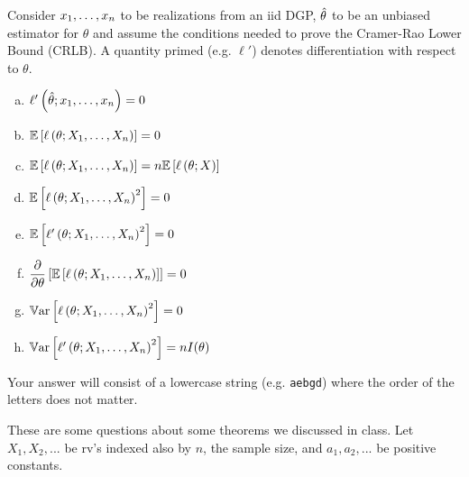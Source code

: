 \documentclass[12pt,landscape]{article}
\newcommand{\instr}{\small Your answer will consist of a lowercase string (e.g. \texttt{aebgd}) where the order of the letters does not matter. \normalsize}
\begin{document}


\problem{} Consider $x_1, \ldots, x_n$ to be realizations from an iid DGP, $\hat{\theta}$ to be an unbiased estimator for $\theta$ and assume the conditions needed to prove the Cramer-Rao Lower Bound (CRLB). A quantity primed (e.g. $\ell'$) denotes differentiation with respect to $\theta$. 

\vspace{-0.2cm}\benum{} 

\begin{enumerate}[(a)]
\item ${\ell'\left(\hat{\theta}; x_1, \ldots, x_n\right)} = 0$
\item $\mathbb{E}\left[\ell\left(\theta; X_1, \ldots, X_n\right)\right] = 0$
\item $\mathbb{E}\left[\ell\left(\theta; X_1, \ldots, X_n\right)\right] = n\mathbb{E}\left[\ell\left(\theta; X\right)\right]$
\item $\mathbb{E}\left[\ell\left(\theta; X_1, \ldots, X_n\right)^2\right] = 0$
\item $\mathbb{E}\left[\ell'\left(\theta; X_1, \ldots, X_n\right)^2\right] = 0$
\item $\dfrac{\partial}{\partial \theta}\left[\mathbb{E}\left[\ell\left(\theta; X_1, \ldots, X_n\right)\right]\right] = 0$
\item $\mathbb{V}\text{ar}\left[\ell\left(\theta; X_1, \ldots, X_n\right)^2\right] = 0$
\item $\mathbb{V}\text{ar}\left[\ell'\left(\theta; X_1, \ldots, X_n\right)^2\right] = nI(\theta)$
\end{enumerate}
\eenum\instr\pagebreak



%
%



\problem{} These are some questions about some theorems we discussed in class. Let $X_1, X_2, ... $ be rv's indexed also by $n$, the sample size, and $a_1, a_2, ...$ be positive constants.

\vspace{-0.2cm}\benum{} 
\end{document}
